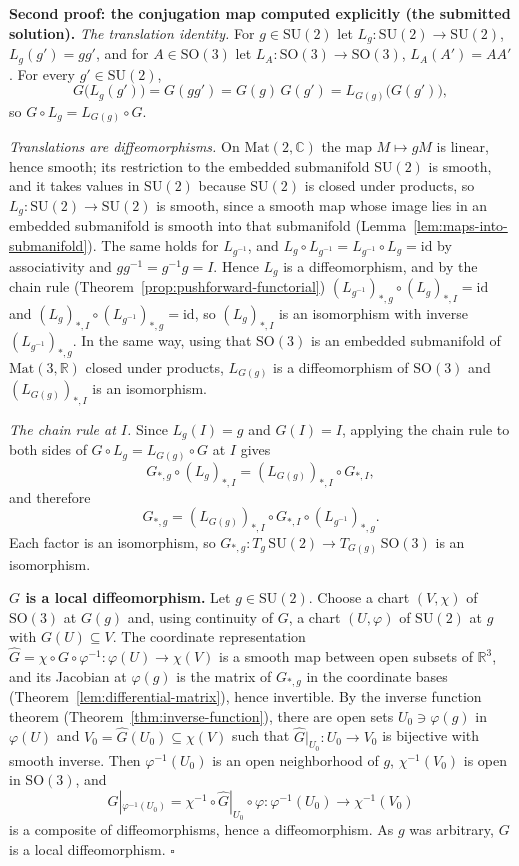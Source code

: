 \documentclass[11pt]{report}
\renewenvironment{proof}[1][Proof]{\noindent\textbf{#1.} }{\hfill$\square$\par\vspace{5pt}}
\begin{document}
\begin{proof}[Second proof: the conjugation map computed explicitly (the submitted solution)]
\emph{The translation identity.} For $g \in \mathrm{SU}(2)$ let $L_g : \mathrm{SU}(2) \to \mathrm{SU}(2)$, $L_g(g') = gg'$, and for $A \in \mathrm{SO}(3)$ let $L_A : \mathrm{SO}(3) \to \mathrm{SO}(3)$, $L_A(A') = AA'$. For every $g' \in \mathrm{SU}(2)$,
\[
G\bigl(L_g(g')\bigr) = G(gg') = G(g)\,G(g') = L_{G(g)}\bigl(G(g')\bigr),
\]
so $G \circ L_g = L_{G(g)} \circ G$.

\emph{Translations are diffeomorphisms.} On $\mathrm{Mat}(2, \mathbb{C})$ the map $M \mapsto gM$ is linear, hence smooth; its restriction to the embedded submanifold $\mathrm{SU}(2)$ is smooth, and it takes values in $\mathrm{SU}(2)$ because $\mathrm{SU}(2)$ is closed under products, so $L_g : \mathrm{SU}(2) \to \mathrm{SU}(2)$ is smooth, since a smooth map whose image lies in an embedded submanifold is smooth into that submanifold (Lemma~\ref{lem:maps-into-submanifold}). The same holds for $L_{g^{-1}}$, and $L_g \circ L_{g^{-1}} = L_{g^{-1}} \circ L_g = \mathrm{id}$ by associativity and $g g^{-1} = g^{-1} g = I$. Hence $L_g$ is a diffeomorphism, and by the chain rule (Theorem~\ref{prop:pushforward-functorial}) $(L_{g^{-1}})_{*,g} \circ (L_g)_{*,I} = \mathrm{id}$ and $(L_g)_{*,I} \circ (L_{g^{-1}})_{*,g} = \mathrm{id}$, so $(L_g)_{*,I}$ is an isomorphism with inverse $(L_{g^{-1}})_{*,g}$. In the same way, using that $\mathrm{SO}(3)$ is an embedded submanifold of $\mathrm{Mat}(3, \mathbb{R})$ closed under products, $L_{G(g)}$ is a diffeomorphism of $\mathrm{SO}(3)$ and $(L_{G(g)})_{*,I}$ is an isomorphism.

\emph{The chain rule at $I$.} Since $L_g(I) = g$ and $G(I) = I$, applying the chain rule to both sides of $G \circ L_g = L_{G(g)} \circ G$ at $I$ gives
\[
G_{*,g} \circ (L_g)_{*,I} = (L_{G(g)})_{*,I} \circ G_{*,I},
\]
and therefore
\[
G_{*,g} = (L_{G(g)})_{*,I} \circ G_{*,I} \circ (L_{g^{-1}})_{*,g} .
\]
Each factor is an isomorphism, so $G_{*,g} : T_g\,\mathrm{SU}(2) \to T_{G(g)}\,\mathrm{SO}(3)$ is an isomorphism.

\textbf{$G$ is a local diffeomorphism.} Let $g \in \mathrm{SU}(2)$. Choose a chart $(V, \chi)$ of $\mathrm{SO}(3)$ at $G(g)$ and, using continuity of $G$, a chart $(U, \varphi)$ of $\mathrm{SU}(2)$ at $g$ with $G(U) \subseteq V$. The coordinate representation $\hat G = \chi \circ G \circ \varphi^{-1} : \varphi(U) \to \chi(V)$ is a smooth map between open subsets of $\mathbb{R}^3$, and its Jacobian at $\varphi(g)$ is the matrix of $G_{*,g}$ in the coordinate bases (Theorem~\ref{lem:differential-matrix}), hence invertible. By the inverse function theorem (Theorem~\ref{thm:inverse-function}), there are open sets $U_0 \ni \varphi(g)$ in $\varphi(U)$ and $V_0 = \hat G(U_0) \subseteq \chi(V)$ such that $\hat G|_{U_0} : U_0 \to V_0$ is bijective with smooth inverse. Then $\varphi^{-1}(U_0)$ is an open neighborhood of $g$, $\chi^{-1}(V_0)$ is open in $\mathrm{SO}(3)$, and
\[
G|_{\varphi^{-1}(U_0)} = \chi^{-1} \circ \hat G|_{U_0} \circ \varphi : \varphi^{-1}(U_0) \to \chi^{-1}(V_0)
\]
is a composite of diffeomorphisms, hence a diffeomorphism. As $g$ was arbitrary, $G$ is a local diffeomorphism.
\end{proof}
\end{document}
